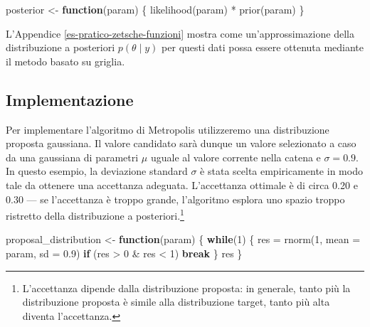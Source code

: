 \documentclass[
  11pt,
]{krantz}
\makeatletter
\newenvironment{Shaded}{\begin{snugshade}}{\end{snugshade}}
\newcommand{\AttributeTok}[1]{\textcolor[rgb]{0.61,0.61,0.61}{#1}}
\newcommand{\ControlFlowTok}[1]{\textcolor[rgb]{0.27,0.27,0.27}{\textbf{#1}}}
\newcommand{\DecValTok}[1]{\textcolor[rgb]{0.06,0.06,0.06}{#1}}
\newcommand{\FloatTok}[1]{\textcolor[rgb]{0.06,0.06,0.06}{#1}}
\newcommand{\FunctionTok}[1]{\textcolor[rgb]{0,0,0}{#1}}
\newcommand{\NormalTok}[1]{#1}
\newcommand{\OtherTok}[1]{\textcolor[rgb]{0.37,0.37,0.37}{#1}}
\newcommand{\SpecialCharTok}[1]{\textcolor[rgb]{0,0,0}{#1}}
\newenvironment{kframe}{%
\medskip{}
\setlength{\fboxsep}{.8em}
 \def\at@end@of@kframe{}%
 \ifinner\ifhmode%
  \def\at@end@of@kframe{\end{minipage}}%
  \begin{minipage}{\columnwidth}%
 \fi\fi%
 \def\FrameCommand##1{\hskip\@totalleftmargin \hskip-\fboxsep
 \colorbox{shadecolor}{##1}\hskip-\fboxsep
     \hskip-\linewidth \hskip-\@totalleftmargin \hskip\columnwidth}%
 \MakeFramed {\advance\hsize-\width
   \@totalleftmargin\z@ \linewidth\hsize
   \@setminipage}}%
 {\par\unskip\endMakeFramed%
 \at@end@of@kframe}
\renewenvironment{Shaded}{\begin{kframe}}{\end{kframe}}
\theoremstyle{definition}
\theoremstyle{definition}
\theoremstyle{definition}
\theoremstyle{definition}
\theoremstyle{remark}
\makeatother
\begin{document}
\begin{Shaded}
\begin{Highlighting}[]
\NormalTok{posterior }\OtherTok{\textless{}{-}} \ControlFlowTok{function}\NormalTok{(param) \{}
  \FunctionTok{likelihood}\NormalTok{(param) }\SpecialCharTok{*} \FunctionTok{prior}\NormalTok{(param)}
\NormalTok{\}}
\end{Highlighting}
\end{Shaded}

L'Appendice \ref{es-pratico-zetsche-funzioni} mostra come un'approssimazione della distribuzione a posteriori \(p(\theta \mid y)\) per questi dati possa essere ottenuta mediante il metodo basato su griglia.

\hypertarget{implementazione}{%
\subsection{Implementazione}\label{implementazione}}

Per implementare l'algoritmo di Metropolis utilizzeremo una distribuzione proposta gaussiana. Il valore candidato sarà dunque un valore selezionato a caso da una gaussiana di parametri \(\mu\) uguale al valore corrente nella catena e \(\sigma = 0.9\). In questo esempio, la deviazione standard \(\sigma\) è stata scelta empiricamente in modo tale da ottenere una accettanza adeguata. L'accettanza ottimale è di circa 0.20 e 0.30 --- se l'accettanza è troppo grande, l'algoritmo esplora uno spazio troppo ristretto della distribuzione a posteriori.\footnote{L'accettanza dipende dalla distribuzione proposta: in generale, tanto più la distribuzione proposta è simile alla distribuzione target, tanto più alta diventa l'accettanza.}

\begin{Shaded}
\begin{Highlighting}[]
\NormalTok{proposal\_distribution }\OtherTok{\textless{}{-}} \ControlFlowTok{function}\NormalTok{(param) \{}
  \ControlFlowTok{while}\NormalTok{(}\DecValTok{1}\NormalTok{) \{}
\NormalTok{    res }\OtherTok{=} \FunctionTok{rnorm}\NormalTok{(}\DecValTok{1}\NormalTok{, }\AttributeTok{mean =}\NormalTok{ param, }\AttributeTok{sd =} \FloatTok{0.9}\NormalTok{)}
    \ControlFlowTok{if}\NormalTok{ (res }\SpecialCharTok{\textgreater{}} \DecValTok{0} \SpecialCharTok{\&}\NormalTok{ res }\SpecialCharTok{\textless{}} \DecValTok{1}\NormalTok{)}
      \ControlFlowTok{break}
\NormalTok{  \}}
\NormalTok{  res}
\NormalTok{\}}
\end{Highlighting}
\end{Shaded}
\end{document}
